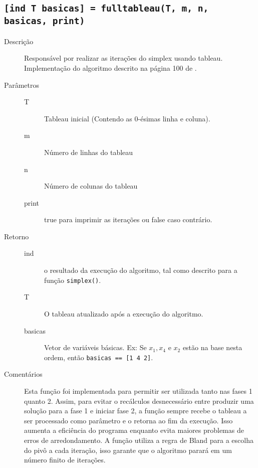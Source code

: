 \documentclass[brazil,times]{abnt}
\begin{document}
\subsection*{\texttt{[ind T basicas] = fulltableau(T, m, n, basicas, print)}}
\begin{description}
	\item[Descrição] Responsável por realizar as iterações do simplex usando tableau. Implementação do algoritmo descrito na página 100 de \cite{Bertsimas:1997:ILO:548834}.
	\item[Parâmetros] 
		\begin{description}
		 \item[T] Tableau inicial (Contendo as 0-ésimas linha e coluna).
		 \item[m] Número de linhas do tableau
		 \item[n] Número de colunas do tableau
		 \item[print] true para imprimir as iterações ou false caso contrário.
		\end{description}
	\item[Retorno]
		\begin{description}
		 \item[ind] o resultado da execução do algoritmo, tal como descrito para a função \texttt{simplex()}.
		 \item[T] O tableau atualizado após a execução do algoritmo.
		 \item[basicas] Vetor de variáveis básicas. Ex: Se $x_1, x_4$ e $x_2$ estão na base nesta ordem, então \texttt{basicas == [1 4 2]}.
		\end{description}
	\item[Comentários] Esta função foi implementada para permitir ser utilizada tanto nas fases 1 quanto 2. Assim, para evitar o recálculos desnecessário entre produzir uma solução para a fase 1 e iniciar fase 2, a função sempre recebe o tableau a ser processado como parâmetro e o retorna ao fim da execução. Isso aumenta a eficiência do programa enquanto evita maiores problemas de erros de arredondamento. A função utiliza a regra de Bland para a escolha do pivô a cada iteração, isso garante que o algoritmo parará em um número finito de iterações.
\end{description}
\end{document}
